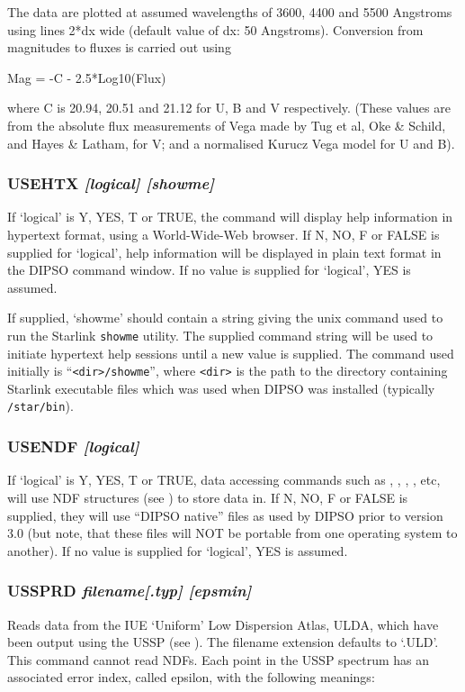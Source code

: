 \documentclass[twoside,11pt,noabs,nolof]{starlink}
\providecommand{\dipcom}[3]{\subsubsection*{\label{COM:#1}\textbf{#1} \emph{#2}}}
\begin{document}
The data are plotted at assumed wavelengths of 3600, 4400 and 5500
Angstroms using lines 2*dx wide (default value of dx: 50 Angstroms).
Conversion from magnitudes to fluxes is carried out using

\begin{terminalv}
Mag = -C - 2.5*Log10(Flux)
\end{terminalv}

where C is 20.94, 20.51 and 21.12 for U, B and V respectively. (These
values are from the absolute flux measurements of Vega made by Tug et
al, Oke \& Schild, and Hayes \& Latham, for V; and a normalised Kurucz
Vega model for U and B).

\dipcom{USEHTX}{[logical] [showme]}{Selects hypertext or plain text format for help information}
If `logical' is Y, YES, T or TRUE, the 
command will display help information in hypertext format, using a
World-Wide-Web browser.
If N, NO, F or FALSE is supplied for `logical', help information will be
displayed in plain text format in the DIPSO command window. If no value
is supplied for `logical', YES is assumed.

If supplied, `showme' should contain a string giving the unix command
used to run the Starlink \texttt{showme} utility. The supplied command
string will be used to initiate hypertext help sessions until a new value
is supplied. The command used initially is ``\verb+<dir>/showme+'', where
\verb+<dir>+ is the path to the directory containing Starlink executable
files which was used when DIPSO was installed (typically \texttt{/star/bin}).

\dipcom{USENDF}{[logical]}{Selects NDF or 'native DIPSO' binary file format}
If `logical' is Y, YES, T or TRUE, data accessing commands such as
, ,
,  ,  etc,
will use NDF structures (see ) to store data in. If
N, NO, F or FALSE is supplied, they will use ``DIPSO native'' files as
used by DIPSO prior to version 3.0 (but note, that these files will NOT
be portable from one operating system to another). If no value is
supplied for `logical', YES is assumed.

\dipcom{USSPRD}{filename[.typ] [epsmin]}{Reads an IUE ULDA spectrum as produced by USSP }
Reads data from the IUE `Uniform' Low Dispersion Atlas, ULDA, which have been
output using the USSP (see ). The filename extension defaults to `.ULD'.
This command cannot read NDFs. Each point in the USSP spectrum has an associated
error index, called epsilon, with the following meanings:
\end{document}
